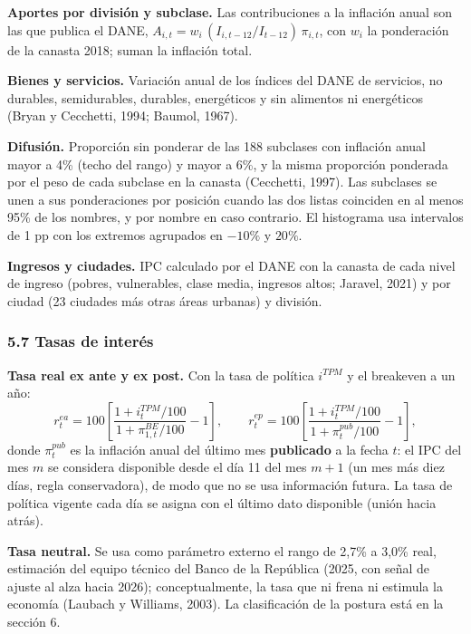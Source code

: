 \textbf{Aportes por división y subclase.} Las contribuciones a la
inflación anual son las que publica el DANE,
\(A_{i,t}=w_i\,(I_{i,t-12}/I_{t-12})\,\pi_{i,t}\), con \(w_i\) la
ponderación de la canasta 2018; suman la inflación total.

\textbf{Bienes y servicios.} Variación anual de los índices del DANE de
servicios, no durables, semidurables, durables, energéticos y sin
alimentos ni energéticos (Bryan y Cecchetti, 1994; Baumol, 1967).

\textbf{Difusión.} Proporción sin ponderar de las 188 subclases con
inflación anual mayor a 4\% (techo del rango) y mayor a 6\%, y la misma
proporción ponderada por el peso de cada subclase en la canasta
(Cecchetti, 1997). Las subclases se unen a sus ponderaciones por
posición cuando las dos listas coinciden en al menos 95\% de los
nombres, y por nombre en caso contrario. El histograma usa intervalos de
1 pp con los extremos agrupados en \(-10\%\) y \(20\%\).

\textbf{Ingresos y ciudades.} IPC calculado por el DANE con la canasta
de cada nivel de ingreso (pobres, vulnerables, clase media, ingresos
altos; Jaravel, 2021) y por ciudad (23 ciudades más otras áreas urbanas)
y división.

\hypertarget{tasas-de-interuxe9s}{%
\subsubsection{5.7 Tasas de interés}\label{tasas-de-interuxe9s}}

\textbf{Tasa real ex ante y ex post.} Con la tasa de política
\(i^{TPM}\) y el breakeven a un año:
\[r^{ea}_t = 100\left[\frac{1+i^{TPM}_t/100}{1+\pi^{BE}_{1,t}/100}-1\right],\qquad
r^{ep}_t = 100\left[\frac{1+i^{TPM}_t/100}{1+\pi^{pub}_t/100}-1\right],\]
donde \(\pi^{pub}_t\) es la inflación anual del último mes
\textbf{publicado} a la fecha \(t\): el IPC del mes \(m\) se considera
disponible desde el día 11 del mes \(m+1\) (un mes más diez días, regla
conservadora), de modo que no se usa información futura. La tasa de
política vigente cada día se asigna con el último dato disponible (unión
hacia atrás).

\textbf{Tasa neutral.} Se usa como parámetro externo el rango de 2,7\% a
3,0\% real, estimación del equipo técnico del Banco de la República
(2025, con señal de ajuste al alza hacia 2026); conceptualmente, la tasa
que ni frena ni estimula la economía (Laubach y Williams, 2003). La
clasificación de la postura está en la sección 6.

